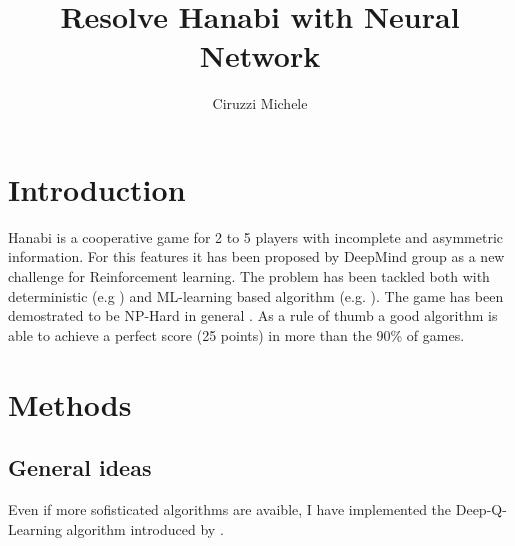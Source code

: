 \documentclass[]{article}
\title{Resolve Hanabi with Neural Network}
\author{Ciruzzi Michele}
\begin{document}
\maketitle

\section{Introduction}
Hanabi is a cooperative game for 2 to 5 players with incomplete and asymmetric information.
For this features it has been proposed by DeepMind group \parencite{BARD2020103216} as a new challenge for Reinforcement learning.
The problem has been tackled both with deterministic (e.g \cite{Cox2015}) and ML-learning based algorithm (e.g. \cite{Lerer2019}).
The game has been demostrated to be NP-Hard in general \parencite{Baffier2016}.
As a rule of thumb a good algorithm is able to achieve a perfect score (25 points) in more than the 90\% of games.

\section{Methods}
\subsection{General ideas}
Even if more sofisticated algorithms are avaible, I have implemented the Deep-Q-Learning algorithm introduced by \textcite{Mnih2015}.

\printbibliography{}
\end{document}
